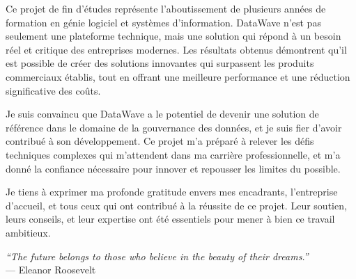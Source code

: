 Ce projet de fin d'études représente l'aboutissement de plusieurs années de formation en génie logiciel et systèmes d'information. DataWave n'est pas seulement une plateforme technique, mais une solution qui répond à un besoin réel et critique des entreprises modernes. Les résultats obtenus démontrent qu'il est possible de créer des solutions innovantes qui surpassent les produits commerciaux établis, tout en offrant une meilleure performance et une réduction significative des coûts.

Je suis convaincu que DataWave a le potentiel de devenir une solution de référence dans le domaine de la gouvernance des données, et je suis fier d'avoir contribué à son développement. Ce projet m'a préparé à relever les défis techniques complexes qui m'attendent dans ma carrière professionnelle, et m'a donné la confiance nécessaire pour innover et repousser les limites du possible.

Je tiens à exprimer ma profonde gratitude envers mes encadrants, l'entreprise d'accueil, et tous ceux qui ont contribué à la réussite de ce projet. Leur soutien, leurs conseils, et leur expertise ont été essentiels pour mener à bien ce travail ambitieux.

\vspace{1cm}

\begin{flushright}
\textit{``The future belongs to those who believe in the beauty of their dreams.''}\\
--- Eleanor Roosevelt
\end{flushright}
